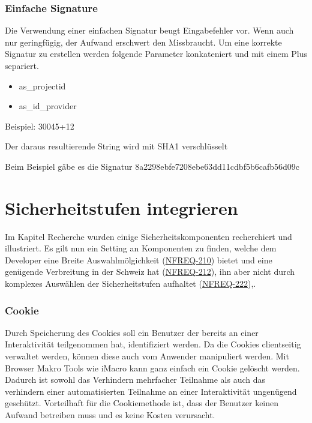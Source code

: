 \subsubsection{Einfache Signature}\label{einfache-signature}

Die Verwendung einer einfachen Signatur beugt Eingabefehler vor. Wenn
auch nur geringfügig, der Aufwand erschwert den Missbraucht. Um eine
korrekte Signatur zu erstellen werden folgende Parameter konkateniert
und mit einem Plus separiert.

\begin{itemize}
\tightlist
\item
  as\_projectid
\item
  as\_id\_provider
\end{itemize}

Beispiel: 30045+12

Der daraus resultierende String wird mit SHA1 verschlüsselt

Beim Beispiel gäbe es die Signatur
8a2298ebfe7208ebe63dd11cdbf5b6cafb56d09c

\newpage

\section{Sicherheitstufen
integrieren}\label{sicherheitstufen-integrieren}

Im Kapitel Recherche wurden einige Sicherheitskomponenten recherchiert
und illustriert. Es gilt nun ein Setting an Komponenten zu finden,
welche dem Developer eine Breite Auswahlmölgichkeit
(\protect\hyperlink{ux5cux23ux5cux23NFREQ-210}{NFREQ-210}) bietet und
eine genügende Verbreitung in der Schweiz hat
(\protect\hyperlink{ux5cux23ux5cux23NFREQ-212}{NFREQ-212}), ihn aber
nicht durch komplexes Auswählen der Sicherheitstufen aufhaltet
(\protect\hyperlink{ux5cux23ux5cux23NFREQ-222}{NFREQ-222}),.

\subsubsection{Cookie}\label{cookie-1}

Durch Speicherung des Cookies soll ein Benutzer der bereits an einer
Interaktivität teilgenommen hat, identifiziert werden. Da die Cookies
clientseitig verwaltet werden, können diese auch vom Anwender
manipuliert werden. Mit Browser Makro Tools wie iMacro kann ganz einfach
ein Cookie gelöscht werden. Dadurch ist sowohl das Verhindern mehrfacher
Teilnahme als auch das verhindern einer automatisierten Teilnahme an
einer Interaktivität ungenügend geschützt. Vorteilhaft für die
Cookiemethode ist, dass der Benutzer keinen Aufwand betreiben muss und
es keine Kosten verursacht.

